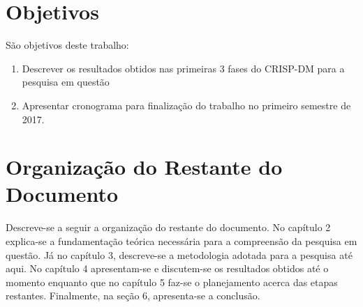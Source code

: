 \section{Objetivos}
São objetivos deste trabalho: 
\begin{enumerate}
    \item Descrever os resultados obtidos nas primeiras 3 fases do CRISP-DM para a
        pesquisa em questão
    \item Apresentar cronograma para finalização do trabalho no primeiro semestre de
        2017.
\end{enumerate}

\section{Organização do Restante do Documento}
\par Descreve-se a seguir a organização do restante do documento. 
No capítulo 2 explica-se a fundamentação teórica necessária para a compreensão da
pesquisa em questão. Já no capítulo 3, descreve-se a metodologia
adotada para a pesquisa até aqui. No capítulo 4 apresentam-se e discutem-se os resultados
obtidos até o momento enquanto que no capítulo 5 faz-se o planejamento acerca das etapas
restantes. Finalmente, na seção 6, apresenta-se a conclusão.
